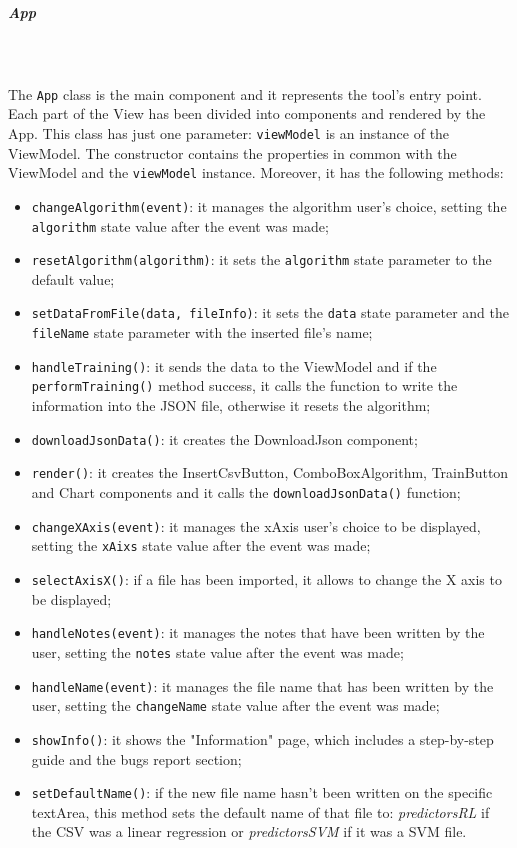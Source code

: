 \subparagraph*{App}\mbox{} \\ \mbox{} \\
The \texttt{App} class is the main component and it represents the tool's entry point. Each part of the View has been divided into components and rendered by the App. This class has just one parameter: \texttt{viewModel} is an instance of the ViewModel. The constructor contains the properties in common with the ViewModel and the \texttt{viewModel} instance. Moreover, it has the following methods:
\begin{itemize}
\item \texttt{changeAlgorithm(event)}: it manages the algorithm user's choice, setting the \\ \texttt{algorithm} state value after the event was made;
\item \texttt{resetAlgorithm(algorithm)}: it sets the \texttt{algorithm} state parameter to the default value;
\item \texttt{setDataFromFile(data, fileInfo)}: it sets the \texttt{data} state parameter and the \\ \texttt{fileName} state parameter with the inserted file's name;
\item \texttt{handleTraining()}: it sends the data to the ViewModel and if the \texttt{performTraining()} method success, it calls the function to write the information into the JSON file, otherwise it resets the algorithm;
\item \texttt{downloadJsonData()}: it creates the DownloadJson component;
\item \texttt{render()}: it creates the InsertCsvButton, ComboBoxAlgorithm, TrainButton and Chart components and it calls the \texttt{downloadJsonData()} function;
\item \texttt{changeXAxis(event)}: it manages the xAxis user's choice to be displayed, setting the \texttt{xAixs} state value after the event was made;
\item \texttt{selectAxisX()}: if a file has been imported, it allows to change the X axis to be displayed;
\item \texttt{handleNotes(event)}: it manages the notes that have been written by the user, setting the \texttt{notes} state value after the event was made;
\item \texttt{handleName(event)}: it manages the file name that has been written by the user, setting the \texttt{changeName} state value after the event was made;
\item \texttt{showInfo()}: it shows the "Information" page, which includes a step-by-step guide and the bugs report section;
\item \texttt{setDefaultName()}: if the new file name hasn't been written on the specific textArea, this method sets the default name of that file to: \textit{predictorsRL} if the CSV was a linear regression or \textit{predictorsSVM} if it was a SVM file.
\end{itemize}	

